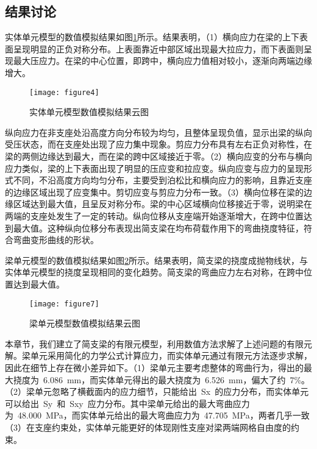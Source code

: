 \subsection{结果讨论}
\label{cha:discussion2}
实体单元模型的数值模拟结果如图\ref{fig:fea}所示。结果表明，（1）横向应力在梁的上下表面呈现明显的正负对称分布。上表面靠近中部区域出现最大拉应力，而下表面则呈现最大压应力。在梁的中心位置，即跨中，横向应力值相对较小，逐渐向两端边缘增大。
\begin{figure}[htbp]
    \centering
	\texttt{[image: figure4]}
    \caption{实体单元模型数值模拟结果云图}
    \label{fig:fea}
\end{figure}
纵向应力在非支座处沿高度方向分布较为均匀，且整体呈现负值，显示出梁的纵向受压状态，而在支座处出现了应力集中现象。剪应力分布具有左右正负对称性，在梁的两侧边缘达到最大，而在梁的跨中区域接近于零。（2）横向应变的分布与横向应力类似，梁的上下表面出现了明显的压应变和拉应变。纵向应变与应力的呈现形式不同，不沿高度方向均匀分布，主要受到泊松比和横向应力的影响，且靠近支座的边缘区域出现了应变集中。剪切应变与剪应力分布一致。（3）横向位移在梁的边缘区域达到最大值，且呈反对称分布。梁的中心区域横向位移接近于零，说明梁在两端的支座处发生了一定的转动。纵向位移从支座端开始逐渐增大，在跨中位置达到最大值。这种纵向位移分布表现出简支梁在均布荷载作用下的弯曲挠度特征，符合弯曲变形曲线的形状。

梁单元模型的数值模拟结果如图\ref{fig:BEAMfea}所示。结果表明，简支梁的挠度成抛物线状，与实体单元模型的挠度呈现相同的变化趋势。简支梁的弯曲应力左右对称，在跨中位置达到最大值。
\begin{figure}[htbp]
    \centering
	\texttt{[image: figure7]}
    \caption{梁单元模型数值模拟结果云图}
    \label{fig:BEAMfea}
\end{figure}

本章节，我们建立了简支梁的有限元模型，利用数值方法求解了上述问题的有限元解。梁单元采用简化的力学公式计算应力，而实体单元通过有限元方法逐步求解，因此在细节上存在微小差异如下。（1）梁单元主要考虑整体的弯曲行为，得出的最大挠度为~6.086~mm，而实体单元得出的最大挠度为~6.526~mm，偏大了约~7\%。（2）梁单元忽略了横截面内的应力细节，只能给出~Sx~的应力分布，而实体单元可以给出~Sy~和~Sxy~应力分布。其中梁单元给出的最大弯曲应力为~48.000~MPa，而实体单元给出的最大弯曲应力为~47.705~MPa，两者几乎一致（3）在支座约束处，实体单元能更好的体现刚性支座对梁两端网格自由度的约束。
